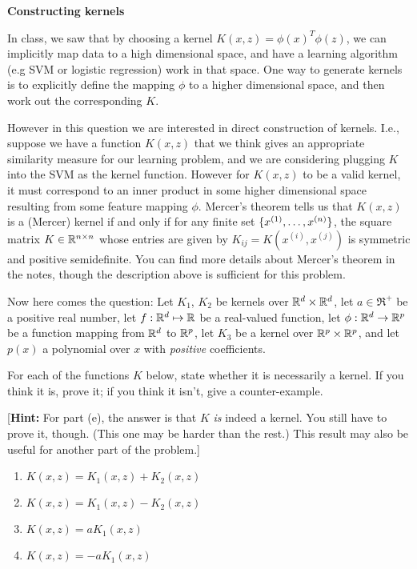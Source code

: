\item {\bf Constructing kernels}

In class, we saw that by choosing a kernel $K(x,z) = \phi(x)^T\phi(z)$, we can
implicitly map data to a high dimensional space, and have a learning algorithm (e.g SVM or logistic regression)
work in that space. One way to generate kernels is to explicitly define the
mapping $\phi$ to a higher dimensional space, and then work out the
corresponding $K$.

However in this question we are interested in direct construction of kernels.
I.e., suppose we have a function $K(x,z)$ that we think gives an appropriate
similarity measure for our learning problem, and we are considering plugging
$K$ into the SVM as the kernel function. However for $K(x,z)$ to be a valid
kernel, it must correspond to an inner product in some higher dimensional space
resulting from some feature mapping $\phi$.  Mercer's theorem tells us that
$K(x,z)$ is a (Mercer) kernel if and only if for any finite set $\{x^{(1)},
\ldots, x^{({n})}\}$, the square matrix $K \in \mathbb{R}^{{n} \times {n}}$ whose entries
are given by $K_{ij} = K(x^{(i)},x^{(j)})$ is symmetric and positive
semidefinite. You can find more details about Mercer's theorem in the notes,
though the description above is sufficient for this problem.

Now here comes the question: Let $K_1$, $K_2$ be kernels over $\mathbb{R}^{{d}} \times
\mathbb{R}^{{d}}$, let $a \in \Re^+$ be a positive real number, let $f : \mathbb{R}^{{d}} \mapsto
\mathbb{R}$ be a real-valued function, let $\phi: \mathbb{R}^{{d}} \rightarrow \mathbb{R}^{p}$ be a
function mapping from $\mathbb{R}^{{d}}$ to $\mathbb{R}^{p}$, let $K_3$ be a kernel over $\mathbb{R}^{p}
\times \mathbb{R}^{p}$, and let $p(x)$ a polynomial over $x$ with \emph{positive}
coefficients.

For each of the functions $K$ below, state whether it is necessarily a
kernel.  If you think it is, prove it; if you think it isn't, give a
counter-example.

[\textbf{Hint:} For part (e), the answer is that $K$ \emph{is} indeed
a kernel. You still have to prove it, though.  (This one may be harder than the
rest.)  This result may also be useful for another part of the problem.]

\begin{enumerate}

\item {} $K(x,z) = K_1(x,z) + K_2(x,z)$
\item {} $K(x,z) = K_1(x,z) - K_2(x,z)$
\item {} $K(x,z) = a K_1(x,z)$
\item {} $K(x,z) = -a K_1(x,z)$

\end{enumerate}